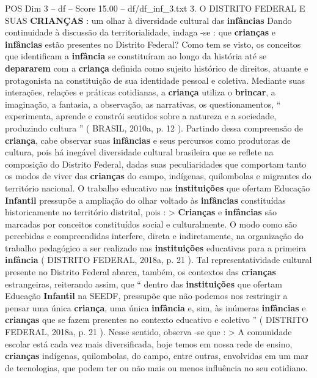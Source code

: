 \begin{textsample}{POS Dim 3 – df – Score 15.00 – df/df\_inf\_3.txt}  \label{ex:f3_pos_126}
3.
O DISTRITO FEDERAL E SUAS \textbf{CRIANÇAS} : um olhar à diversidade cultural das \textbf{infâncias} Dando continuidade à discussão da territorialidade, indaga -se : que \textbf{crianças} e \textbf{infâncias} estão presentes no Distrito Federal?
Como tem se visto, os conceitos que identificam a \textbf{infância} se constituíram ao longo da história até se \textbf{depararem} com a \textbf{criança} definida como sujeito histórico de direitos, atuante e protagonista na constituição de sua identidade pessoal e coletiva.
Mediante suas interações, relações e práticas cotidianas, a \textbf{criança} utiliza o \textbf{brincar}, a imaginação, a fantasia, a observação, as narrativas, os questionamentos, “ experimenta, aprende e constrói sentidos sobre a natureza e a sociedade, produzindo cultura ” ( BRASIL, 2010a, p. 12 ).
Partindo dessa compreensão de \textbf{criança}, cabe observar suas \textbf{infâncias} e seus percursos como produtoras de cultura, pois há inegável diversidade cultural brasileira que se reflete na composição do Distrito Federal, dadas suas peculiaridades que comportam tanto os modos de viver das \textbf{crianças} do campo, indígenas, quilombolas e migrantes do território nacional.
O trabalho educativo nas \textbf{instituições} que ofertam Educação \textbf{Infantil} pressupõe a ampliação do olhar voltado às \textbf{infâncias} constituídas historicamente no território distrital, pois : > \textbf{Crianças} e \textbf{infâncias} são marcadas por conceitos constituídos social e culturalmente.
O modo como são percebidas e compreendidas interfere, direta e indiretamente, na organização do trabalho pedagógico a ser realizado nas \textbf{instituições} educativas para a primeira \textbf{infância} ( DISTRITO FEDERAL, 2018a, p. 21 ).
Tal representatividade cultural presente no Distrito Federal abarca, também, os contextos das \textbf{crianças} estrangeiras, reiterando assim, que “ dentro das \textbf{instituições} que ofertam Educação \textbf{Infantil} na SEEDF, pressupõe que não podemos nos restringir a pensar uma única \textbf{criança}, uma única \textbf{infância} e, sim, às inúmeras \textbf{infâncias} e \textbf{crianças} que se fazem presentes no contexto educativo e coletivo ” ( DISTRITO FEDERAL, 2018a, p. 21 ).
Nesse sentido, observa -se que : > A comunidade escolar está cada vez mais diversificada, hoje temos em nossa rede de ensino, \textbf{crianças} indígenas, quilombolas, do campo, entre outras, envolvidas em um mar de tecnologias, que podem ter ou não mais ou menos influência no seu cotidiano.

\end{textsample}
